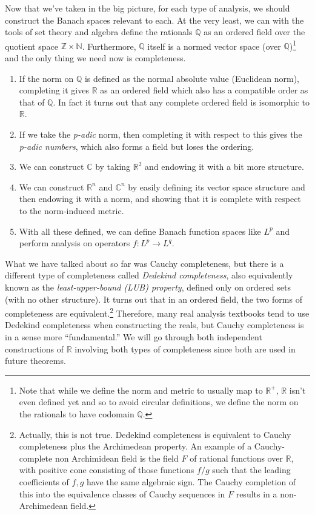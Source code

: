 \documentclass{article}
\begin{document}
  Now that we've taken in the big picture, for each type of analysis, we should construct the Banach spaces relevant to each. At the very least, we can with the tools of set theory and algebra define the rationals $\mathbb{Q}$ as an ordered field over the quotient space $\mathbb{Z} \times \mathbb{N}$. Furthermore, $\mathbb{Q}$ itself is a normed vector space (over $\mathbb{Q}$)\footnote{Note that while we define the norm and metric to usually map to $\mathbb{R}^+$, $\mathbb{R}$ isn't even defined yet and so to avoid circular definitions, we define the norm on the rationals to have codomain $\mathbb{Q}$. } and the only thing we need now is completeness. 
  \begin{enumerate}
    \item If the norm on $\mathbb{Q}$ is defined as the normal absolute value (Euclidean norm), completing it gives $\mathbb{R}$ as an ordered field which also has a compatible order as that of $\mathbb{Q}$. In fact it turns out that any complete ordered field is isomorphic to $\mathbb{R}$. 
    \item If we take the \textit{p-adic} norm, then completing it with respect to this gives the \textit{p-adic numbers}, which also forms a field but loses the ordering. 
    \item We can construct $\mathbb{C}$ by taking $\mathbb{R}^2$ and endowing it with a bit more structure. 
    \item We can construct $\mathbb{R}^n$ and $\mathbb{C}^n$ by easily defining its vector space structure and then endowing it with a norm, and showing that it is complete with respect to the norm-induced metric. 
    \item With all these defined, we can define Banach function spaces like $L^p$ and perform analysis on operators $f: L^p \rightarrow L^q$. 
  \end{enumerate}
  What we have talked about so far was Cauchy completeness, but there is a different type of completeness called \textit{Dedekind completeness}, also equivalently known as the \textit{least-upper-bound (LUB) property}, defined only on ordered sets (with no other structure). It turns out that in an ordered field, the two forms of completeness are equivalent.\footnote{Actually, this is not true. Dedekind completeness is equivalent to Cauchy completeness plus the Archimedean property. An example of a Cauchy-complete non Archimidean field is the field $F$ of rational functions over $\mathbb{R}$, with positive cone consisting of those functions $f/g$ such that the leading coefficients of $f, g$ have the same algebraic sign. The Cauchy completion of this into the equivalence classes of Cauchy sequences in $F$ results in a non-Archimedean field. } Therefore, many real analysis textbooks tend to use Dedekind completeness when constructing the reals, but Cauchy completeness is in a sense more ``fundamental.'' We will go through both independent constructions of $\mathbb{R}$ involving both types of completeness since both are used in future theorems. 
\end{document}
